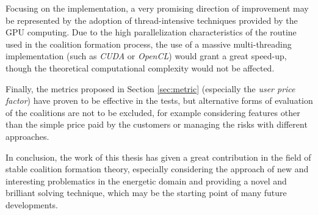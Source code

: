 \documentclass[11pt, twoside, titlepage, a4paper, openright]{report}
\begin{document}
Focusing on the implementation, a very promising direction of improvement may be represented by the adoption of thread-intensive techniques provided by the GPU computing. Due to the high parallelization characteristics of the routine used in the coalition formation process, the use of a massive multi-threading implementation (such as \textit{CUDA} or \textit{OpenCL}) would grant a great speed-up, though the theoretical computational complexity would not be affected.

Finally, the metrics proposed in Section \ref{sec:metric} (especially the \textit{user price factor}) have proven to be effective in the tests, but alternative forms of evaluation of the coalitions are not to be excluded, for example considering features other than the simple price paid by the customers or managing the risks with different approaches.

In conclusion, the work of this thesis has given a great contribution in the field of stable coalition formation theory, especially considering the approach of new and interesting problematics in the energetic domain and providing a novel and brilliant solving technique, which may be the starting point of many future developments.



\end{document}
